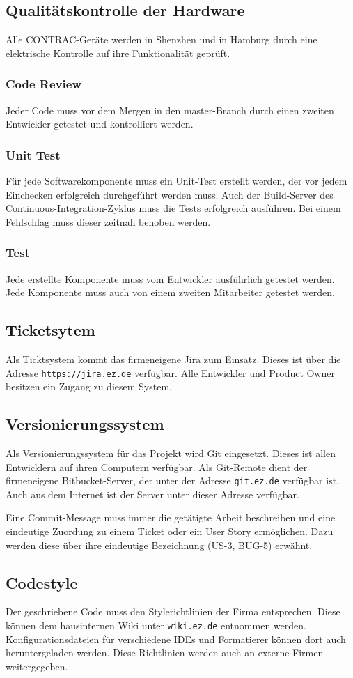 \subsection{Qualitätskontrolle der Hardware}
Alle CONTRAC-Geräte werden in Shenzhen und in Hamburg durch eine elektrische Kontrolle auf ihre Funktionalität geprüft.
\subsubsection{Code Review}
Jeder Code muss vor dem Mergen in den master-Branch durch einen zweiten Entwickler getestet und kontrolliert werden.
\subsubsection{Unit Test}
Für jede Softwarekomponente muss ein Unit-Test erstellt werden, der vor jedem Einchecken erfolgreich durchgeführt werden muss. Auch der Build-Server des Continuous-Integration-Zyklus muss die Tests erfolgreich ausführen. Bei einem Fehlschlag muss dieser zeitnah behoben werden.
\subsubsection{Test}
Jede erstellte Komponente muss vom Entwickler ausführlich getestet werden. Jede Komponente muss auch von einem zweiten Mitarbeiter getestet werden.
\subsection{Ticketsytem}
Als Ticktsystem kommt das firmeneigene Jira zum Einsatz. Dieses ist über die Adresse \texttt{https://jira.ez.de} verfügbar. Alle Entwickler und Product Owner besitzen ein Zugang zu diesem System.
\subsection{Versionierungssystem}
Als Versionierungssystem für das Projekt wird Git eingesetzt. Dieses ist allen Entwicklern auf ihren Computern verfügbar. Als Git-Remote dient der firmeneigene Bitbucket-Server, der unter der Adresse \texttt{git.ez.de} verfügbar ist. Auch aus dem Internet ist der Server unter dieser Adresse verfügbar.

Eine Commit-Message muss immer die getätigte Arbeit beschreiben und eine eindeutige Zuordung zu einem Ticket oder ein User Story ermöglichen. Dazu werden diese über ihre eindeutige Bezeichnung (US-3, BUG-5) erwähnt.
\subsection{Codestyle}
Der geschriebene Code muss den Stylerichtlinien der Firma entsprechen. Diese können dem hausinternen Wiki unter \texttt{wiki.ez.de} entnommen werden. Konfigurationsdateien für verschiedene IDEs und Formatierer können dort auch heruntergeladen werden. Diese Richtlinien werden auch an externe Firmen weitergegeben. 
